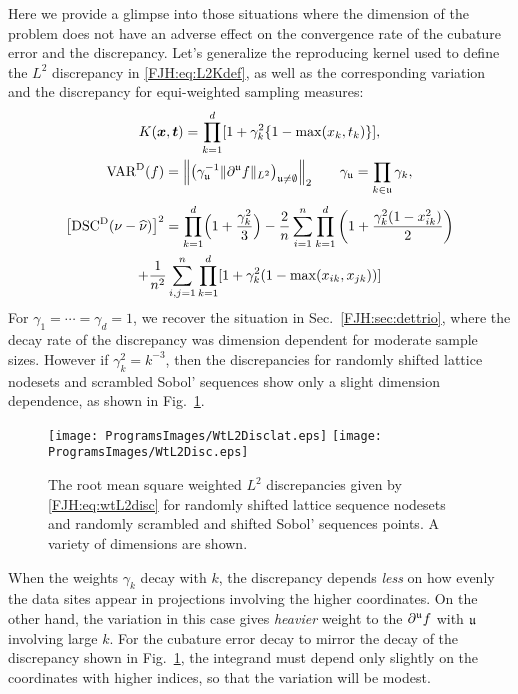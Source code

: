 \documentclass[graybox,footinfo]{svmult}
\begin{document}
Here we provide a glimpse into those situations where the dimension of the problem does 
not have an adverse effect on the convergence rate of the cubature error and the 
discrepancy.  Let's generalize the reproducing kernel used to define the 
$L^2$ discrepancy in \eqref{FJH:eq:L2Kdef}, as well as the corresponding 
variation and the discrepancy for equi-weighted sampling measures:
\begin{gather*} \label{FJH:eq:wtL2Kdef}
K(\bsx,\bst) =\prod_{k = 1}^d [1 + \gamma_k^2\{1 - \max(x_k,t_k)\}], \\
\Var^\Dt(f) = \Bigl \lVert \bigl (\gamma_{\fraku}^{-1}
\lVert\partial^{\fraku} f\rVert_{L^2}\bigr )_{\fraku \ne \emptyset} \Bigr \rVert_2 \qquad
\gamma_{\fraku} = \prod_{k \in \fraku} \gamma_k,
\end{gather*}
\begin{multline} \label{FJH:eq:wtL2disc}
\bigl[\disc^\Dt(\nu - \hnu)\bigr]^2 = \prod_{k=1}^d\Bigl(1 + \frac{\gamma_k^2}{3}\Bigr)
- \frac{2}{n} \sum_{i=1}^n \prod_{k=1}^d \left (1 + \frac{\gamma_k^2(1 - 
x_{ik}^2)}{2} \right) \\ + \frac{1}{n^2}\sum_{i,j=1}^n \prod_{k = 1}^d [1 + 
\gamma_k^2( 1 - \max(x_{ik},x_{jk}))]
\end{multline}
For $\gamma_1 = \cdots = \gamma_d = 1$, we recover the situation in Sec.\ 
\ref{FJH:sec:dettrio}, where the decay rate of the discrepancy was dimension dependent 
for moderate sample sizes.  However if $\gamma_k^2 = 
k^{-3}$, then the discrepancies for randomly shifted lattice nodesets and scrambled   
Sobol' sequences show only a slight dimension dependence, as shown in Fig.\ 
\ref{FJH:fig:wtdiscdiffpts}.

\begin{figure}
	\centering
	\texttt{[image: ProgramsImages/WtL2Disclat.eps]}   \qquad 
	\texttt{[image: ProgramsImages/WtL2Disc.eps]} 
	\caption{The root mean square weighted $L^2$ discrepancies given by 
	\eqref{FJH:eq:wtL2disc} 
		for randomly shifted 
		lattice sequence nodesets and randomly scrambled and shifted Sobol' sequences 
		points.  A variety of dimensions are shown.
		\label{FJH:fig:wtdiscdiffpts}}
\end{figure}

When the weights $\gamma_k$ decay with $k$, the discrepancy depends \emph{less} 
on how evenly the data sites appear in projections involving the higher coordinates.  On 
the other hand, the variation in this case gives 
\emph{heavier} weight to the $\partial^{{\mathfrak{u}}} f$ with 
${\mathfrak{u}}$ involving large $k$.  For the cubature error decay to mirror the decay of the 
discrepancy shown in Fig.\ \ref{FJH:fig:wtdiscdiffpts}, the integrand must depend only 
slightly on the coordinates with higher indices, so that the variation will be modest.
\end{document}
